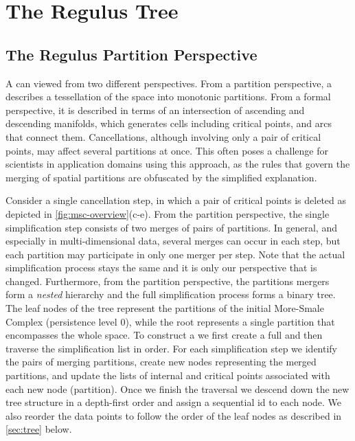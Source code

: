 \section{The Regulus Tree}
\label{sec:regulus}

\subsection{The Regulus Partition Perspective}
A \MSC can viewed from two different perspectives. From a partition perspective, a \MSC describes a tessellation of the space into monotonic partitions.  From a formal perspective, it is described in terms of an intersection of ascending and descending manifolds, which generates cells including critical points, and arcs that connect them.  
Cancellations, although involving only a pair of critical points,  may affect several partitions at once. This often poses a challenge for scientists in application domains using this approach, as the rules that govern the merging of spatial partitions are obfuscated by the simplified explanation.

Consider a single cancellation step, in which a pair of critical points is deleted as depicted in \autoref{fig:msc-overview}(c-e). From the partition perspective, the single simplification step consists of two merges of pairs of partitions. In general, and especially in multi-dimensional data, several merges can occur in each step, but each partition may participate in only one merger per step. Note that the actual simplification process stays the same and it is only our perspective that is changed. Furthermore, from the partition perspective, the partitions mergers form a \textit{nested} hierarchy and the full simplification process forms a binary tree. The leaf nodes of the tree represent the partitions of the initial More-Smale Complex (persistence level 0), while the root represents a single partition that encompasses the whole space. To construct a \RT we first create a full \MSC and then traverse the simplification list in order. For each simplification step we identify the pairs of merging partitions, create new nodes representing the merged partitions, and update the lists of internal and critical points associated with each new node (partition). Once we finish the traversal we descend down the new tree structure in a depth-first order and assign a sequential id to each node. We also reorder the data points to follow the order of the leaf nodes as described in \autoref{sec:tree} below. 


